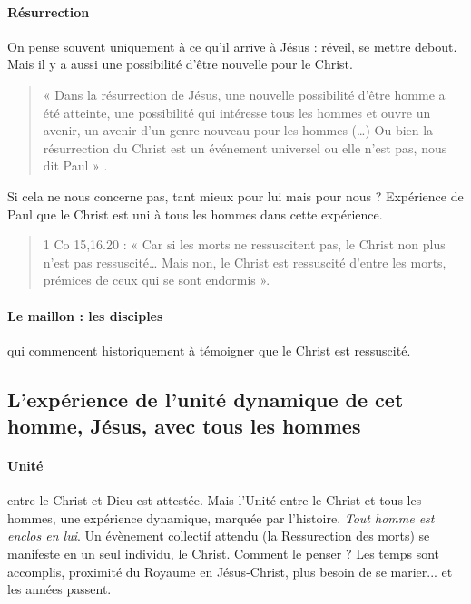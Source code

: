     \paragraph{Résurrection} On pense souvent uniquement à ce qu'il arrive à Jésus : réveil, se mettre debout. Mais il y a aussi une possibilité d'être nouvelle pour le Christ.
    \begin{quote}
        «  Dans  la  résurrection  de  Jésus,  une  nouvelle  possibilité  d’être  homme  a  été  atteinte,  une possibilité  qui  intéresse  tous  les  hommes  et  ouvre  un  avenir,  un  avenir  d’un  genre  nouveau pour  les  hommes  (…)  Ou  bien  la  résurrection  du  Christ  est  un  événement  universel  ou  elle n’est  pas, nous  dit  Paul  »  .   
    \end{quote}
   Si cela ne nous concerne pas, tant mieux pour lui mais pour nous ? Expérience de Paul que le Christ est uni à tous les hommes dans cette expérience. 
   \begin{quote}
       1  Co  15,16.20  :  «  Car  si  les  morts  ne  ressuscitent  pas,  le  Christ  non  plus  n’est  pas ressuscité… Mais  non,  le  Christ  est  ressuscité  d’entre  les  morts,  prémices  de  ceux  qui  se  sont endormis  ». 
   \end{quote}
    

\paragraph{Le maillon : les disciples} qui commencent historiquement à témoigner que le Christ est ressuscité. 


\subsection{L'expérience de l'unité dynamique de cet homme, Jésus, avec
    tous les hommes}
    

\paragraph{Unité} entre le Christ et Dieu est attestée. Mais l'Unité entre le Christ et tous les hommes, une expérience dynamique, marquée par l'histoire. \textit{Tout homme est enclos en lui}. Un évènement collectif attendu (la Ressurection des morts) se manifeste en un seul individu, le Christ. Comment le penser ? Les temps sont accomplis, proximité du Royaume en Jésus-Christ, plus besoin de se marier... et les années passent. 

